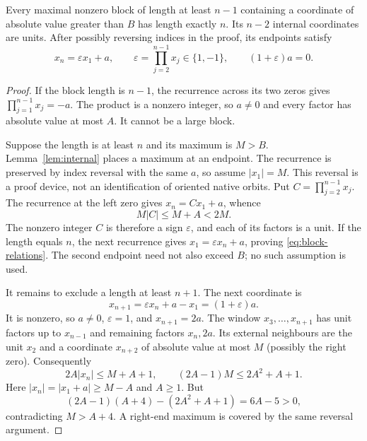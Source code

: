 \begin{lemma}
\label{lem:large-block}
Every maximal nonzero block of length at least $n-1$ containing a
coordinate of absolute value greater than $B$ has length exactly $n$.
Its $n-2$ internal coordinates are units. After possibly reversing
indices in the proof, its endpoints satisfy
\begin{equation}
 x_n=\varepsilon x_1+a,\qquad
 \varepsilon=\prod_{j=2}^{n-1}x_j\in\{1,-1\},\qquad
 (1+\varepsilon)a=0.
 \label{eq:block-relations}
\end{equation}
\end{lemma}
\begin{proof}
If the block length is $n-1$, the recurrence across its two zeros
gives $\prod_{j=1}^{n-1}x_j=-a$. The product is a nonzero integer,
so $a\ne0$ and every factor has absolute value at most $A$.
It cannot be a large block.

Suppose the length is at least $n$ and its maximum is $M>B$.
Lemma~\ref{lem:internal} places a maximum at an endpoint.
The recurrence is preserved by index reversal with the same $a$,
so assume $|x_1|=M$. This reversal is a proof device, not an
identification of oriented native orbits. Put
$C=\prod_{j=2}^{n-1}x_j$. The recurrence at the left zero gives
$x_n=Cx_1+a$, whence
\[
 M|C|\le M+A<2M.
\]
The nonzero integer $C$ is therefore a sign $\varepsilon$, and each
of its factors is a unit. If the length equals $n$, the next
recurrence gives $x_1=\varepsilon x_n+a$, proving
\eqref{eq:block-relations}. The second endpoint need not also
exceed $B$; no such assumption is used.

It remains to exclude a length at least $n+1$. The next coordinate is
\[
 x_{n+1}=\varepsilon x_n+a-x_1=(1+\varepsilon)a.
\]
It is nonzero, so $a\ne0$, $\varepsilon=1$, and $x_{n+1}=2a$.
The window $x_3,\ldots,x_{n+1}$ has unit factors up to $x_{n-1}$
and remaining factors $x_n,2a$. Its external neighbours are the
unit $x_2$ and a coordinate $x_{n+2}$ of absolute value at most $M$
(possibly the right zero). Consequently
\[
 2A|x_n|\le M+A+1,\qquad
 (2A-1)M\le2A^2+A+1.
\]
Here $|x_n|=|x_1+a|\ge M-A$ and $A\ge1$. But
\[
 (2A-1)(A+4)-(2A^2+A+1)=6A-5>0,
\]
contradicting $M>A+4$. A right-end maximum is covered by the same
reversal argument.
\end{proof}

